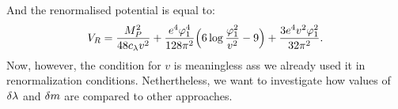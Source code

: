 And the renormalised potential is equal to:
\begin{align}
V_R = \frac{M_P^2}{48c_\lambda v^2}+\frac{e^4\varphi_1^4}{128\pi^2}\Big(6\log{
\frac{\varphi_1^2}{v^2}} - 9\Big)+\frac{3e^4v^2\varphi_1^2}{32\pi^2}.
\end{align}
Now, however, the condition for $v$ is meaningless ass we already used it in renormalization 
conditions. Nethertheless, we want to investigate how values of $\delta\lambda$ and $\delta m$ are compared 
to other approaches.
